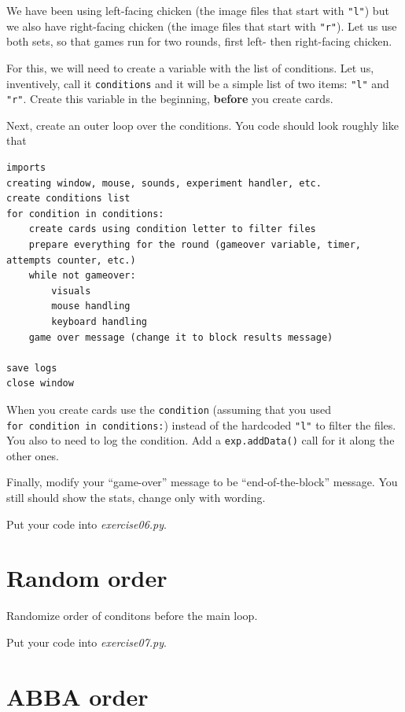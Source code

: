 \documentclass[
]{book}
\begin{document}
We have been using left-facing chicken (the image files that start with \texttt{"l"}) but we also have right-facing chicken (the image files that start with \texttt{"r"}). Let us use both sets, so that games run for two rounds, first left- then right-facing chicken.

For this, we will need to create a variable with the list of conditions. Let us, inventively, call it \texttt{conditions} and it will be a simple list of two items: \texttt{"\textquotesingle{}l\textquotesingle{}"} and \texttt{"r"}. Create this variable in the beginning, \textbf{before} you create cards.

Next, create an outer loop over the conditions. You code should look roughly like that

\begin{verbatim}
imports
creating window, mouse, sounds, experiment handler, etc.
create conditions list
for condition in conditions:
    create cards using condition letter to filter files
    prepare everything for the round (gameover variable, timer, attempts counter, etc.)
    while not gameover:
        visuals
        mouse handling
        keyboard handling
    game over message (change it to block results message)
        
save logs
close window
\end{verbatim}

When you create cards use the \texttt{condition} (assuming that you used \texttt{for\ condition\ in\ conditions:}) instead of the hardcoded \texttt{"l"} to filter the files. You also to need to log the condition. Add a \texttt{exp.addData()} call for it along the other ones.

Finally, modify your ``game-over'' message to be ``end-of-the-block'' message. You still should show the stats, change only with wording.

Put your code into \emph{exercise06.py}.

\hypertarget{random-order}{%
\section{Random order}\label{random-order}}

Randomize order of conditons before the main loop.

Put your code into \emph{exercise07.py}.

\hypertarget{abba-order}{%
\section{ABBA order}\label{abba-order}}
\end{document}
